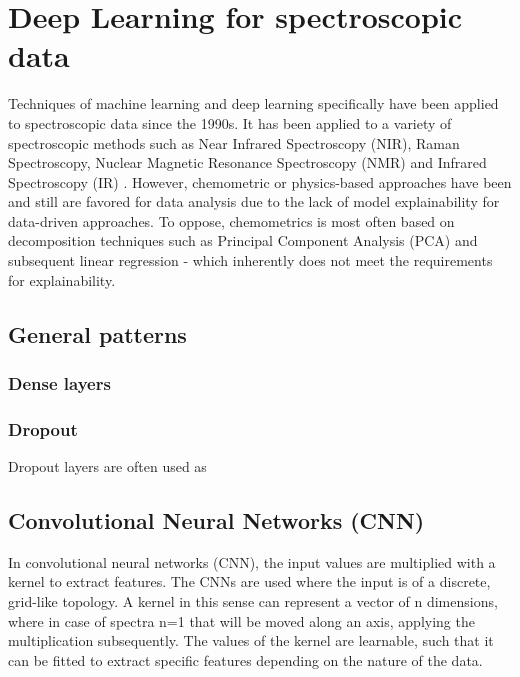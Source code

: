 \label{DL_theory}
\section{Deep Learning for spectroscopic data}

Techniques of machine learning and deep learning specifically have been applied to spectroscopic data since the 1990s. It has been applied to a variety of spectroscopic methods such as Near Infrared Spectroscopy (NIR), Raman Spectroscopy, Nuclear Magnetic Resonance Spectroscopy (NMR) and Infrared Spectroscopy (IR) . However, chemometric or physics-based approaches have been and still are favored for data analysis due to the lack of model explainability for data-driven approaches. To oppose, chemometrics is most often based on decomposition techniques such as Principal Component Analysis (PCA) and subsequent linear regression - which inherently does not meet the requirements for explainability.


\subsection{General patterns}

\subsubsection{Dense layers}
\subsubsection{Dropout}
Dropout layers are often used as 
\subsubsection{}

\subsection{Convolutional Neural Networks (CNN)}

In convolutional neural networks (CNN), the input values are multiplied with a kernel to extract features. The CNNs are used where the input is of a discrete, grid-like topology. A kernel in this sense can represent a vector of n dimensions, where in case of spectra n=1 that will be moved along an axis, applying the multiplication subsequently. The values of the kernel are learnable, such that it can be fitted to extract specific features depending on the nature of the data.

